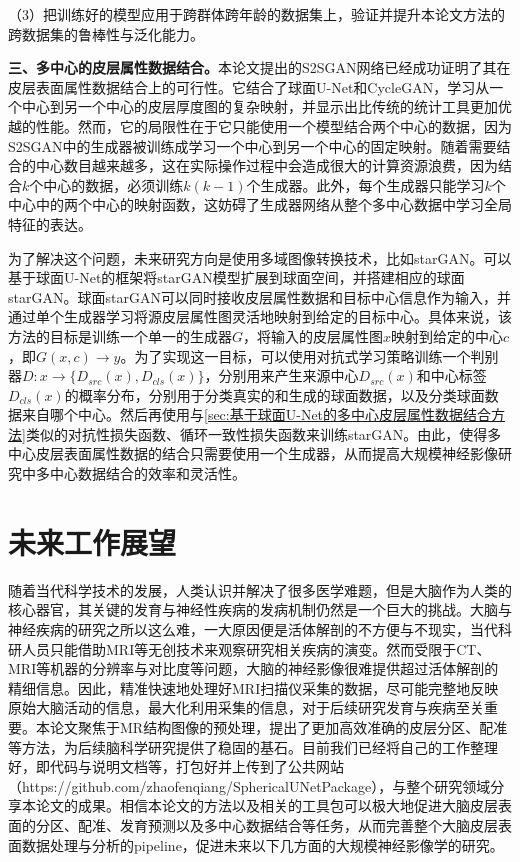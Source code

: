 （3）把训练好的模型应用于跨群体跨年龄的数据集上，验证并提升本论文方法的跨数据集的鲁棒性与泛化能力。

\textbf{三、多中心的皮层属性数据结合。}本论文提出的S2SGAN网络已经成功证明了其在皮层表面属性数据结合上的可行性。它结合了球面U-Net和CycleGAN，学习从一个中心到另一个中心的皮层厚度图的复杂映射，并显示出比传统的统计工具更加优越的性能。然而，它的局限性在于它只能使用一个模型结合两个中心的数据，因为S2SGAN中的生成器被训练成学习一个中心到另一个中心的固定映射。随着需要结合的中心数目越来越多，这在实际操作过程中会造成很大的计算资源浪费，因为结合$k$个中心的数据，必须训练$k(k-1)$个生成器。此外，每个生成器只能学习$k$个中心中的两个中心的映射函数，这妨碍了生成器网络从整个多中心数据中学习全局特征的表达。

为了解决这个问题，未来研究方向是使用多域图像转换技术，比如starGAN\cite{choi2018stargan}。可以基于球面U-Net的框架将starGAN模型扩展到球面空间，并搭建相应的球面starGAN。球面starGAN可以同时接收皮层属性数据和目标中心信息作为输入，并通过单个生成器学习将源皮层属性图灵活地映射到给定的目标中心。具体来说，该方法的目标是训练一个单一的生成器$G$，将输入的皮层属性图$x$映射到给定的中心$c$，即$G(x,c)\rightarrow y$。为了实现这一目标，可以使用对抗式学习策略\cite{goodfellow2014generative}训练一个判别器$D:x\rightarrow \{D_{src}(x),D_{cls}(x)\}$，分别用来产生来源中心$D_{src}(x)$和中心标签$D_{cls}(x)$的概率分布，分别用于分类真实的和生成的球面数据，以及分类球面数据来自哪个中心。然后再使用与\ref{sec:基于球面U-Net的多中心皮层属性数据结合方法}类似的对抗性损失函数、循环一致性损失函数来训练starGAN。由此，使得多中心皮层表面属性数据的结合只需要使用一个生成器，从而提高大规模神经影像研究中多中心数据结合的效率和灵活性。


\section{未来工作展望}
随着当代科学技术的发展，人类认识并解决了很多医学难题，但是大脑作为人类的核心器官，其关键的发育与神经性疾病的发病机制仍然是一个巨大的挑战。大脑与神经疾病的研究之所以这么难，一大原因便是活体解剖的不方便与不现实，当代科研人员只能借助MRI等无创技术来观察研究相关疾病的演变。然而受限于CT、MRI等机器的分辨率与对比度等问题，大脑的神经影像很难提供超过活体解剖的精细信息。因此，精准快速地处理好MRI扫描仪采集的数据，尽可能完整地反映原始大脑活动的信息，最大化利用采集的信息，对于后续研究发育与疾病至关重要。本论文聚焦于MR结构图像的预处理，提出了更加高效准确的皮层分区、配准等方法，为后续脑科学研究提供了稳固的基石。目前我们已经将自己的工作整理好，即代码与说明文档等，打包好并上传到了公共网站（https://github.com/zhaofenqiang/SphericalUNetPackage），与整个研究领域分享本论文的成果。相信本论文的方法以及相关的工具包可以极大地促进大脑皮层表面的分区、配准、发育预测以及多中心数据结合等任务，从而完善整个大脑皮层表面数据处理与分析的pipeline，促进未来以下几方面的大规模神经影像学的研究。

